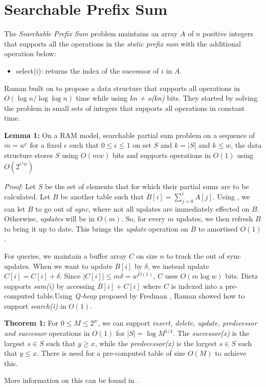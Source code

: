 \section{Searchable Prefix Sum}
The \textit{Searchable Prefix Sum} problem maintains an array $A$ of $n$ positive integers that supports all the operations in the \textit{static prefix sum} with the additional operation below:
\begin{itemize}
    \item select(i): returns the index of the successor of $i$ in $A$.
\end{itemize}
Raman \cite{Raman_2001} built on \cite{Dietz_1989} to propose a data structure that supports all operations in $O(\log n / \log \log n)$ time while using \textit{kn + o(kn)} bits. They started by solving the problem in small sets of integers that supports all operations in constant time.\par
\textbf{Lemma 1:} On a RAM model, searchable partial sum problem on a sequence of $m = w^\epsilon$ for a fixed $\epsilon$ such that $0 \leq \epsilon \leq 1$ on set $S$ and $k = |S|$ and $k \leq w$, the data structure stores $S$ using $O(mw)$ bits and supports operations in $O(1)$ using $O(2^{\epsilon^1 w})$\par
\textit{Proof:} Let $S$ be the set of elements that for which their partial sums are to be calculated. Let $B$ be another table such that $B[i] = \sum_{j=0}^{i} A[j]$. Using \cite{Dietz_1989}, we can let $B$ to go out of \textit{sync}, where not all updates are immediately effected on $B$. Otherwise, \textit{updates} will be in $O(m)$. So, for every $m$ updates, we then refresh $B$ to bring it up to date. This brings the \textit{update} operation on $B$ to amortised $O(1)$.\par
For queries, we maintain a buffer array $C$ on size $n$ to track the out of sync updates. When we want to update $B[i]$ by $\delta$, we instead update $C[i] = C[i] + \delta$. Since $|C[i]| \leq m\delta = w^{O(1)}$, $C$ uses $O(m\log w)$ bits. Dietz \cite{Dietz_1989} supports \textit{sum(i)} by accessing $B[i] + C[i]$ where $C$ is indexed into a pre-computed table.Using \textit{Q-heap} proposed by Fredman \cite{Fredman_1982}, Raman showed how to support \textit{search(i)} in $O(1)$. \par
\textbf{Theorem 1:} For $0 \leq M \leq 2^w$, we can support \textit{insert, delete, update, predecessor and successor} operations in $O(1)$ for $|S| = \log M^{1/4}$. The \textit{successor(x)} is the largest $s \in S$ such that $y \geq x$, while the \textit{predecessor(x)} is the largest $s \in S$ such that $y \leq x$. There is need for a pre-computed table of size $O(M)$ to achieve this. 
\par More information on this can be found in \cite{Raman_2001}.
\FloatBarrier
